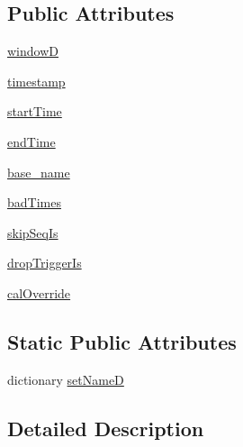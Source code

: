 \subsection*{Public Attributes}
\begin{DoxyCompactItemize}
\item 
\hyperlink{classrepo_1_1programs_1_1pythonpackages_1_1pr_1_1SPDataSet_1_1SPDataSet_a0792732403840d5f03968b1888fa42d6}{window\-D}
\item 
\hyperlink{classrepo_1_1programs_1_1pythonpackages_1_1pr_1_1SPDataSet_1_1SPDataSet_ab6db3c53a18a01fec96f0973c394702a}{timestamp}
\item 
\hyperlink{classrepo_1_1programs_1_1pythonpackages_1_1pr_1_1SPDataSet_1_1SPDataSet_a6e2d1324af2938ac6b23d63d9f8a89c7}{start\-Time}
\item 
\hyperlink{classrepo_1_1programs_1_1pythonpackages_1_1pr_1_1SPDataSet_1_1SPDataSet_ae9f5e533c3e8e9cd46cc8471ef58c2dd}{end\-Time}
\item 
\hyperlink{classrepo_1_1programs_1_1pythonpackages_1_1pr_1_1SPDataSet_1_1SPDataSet_a888b03e4e0141101e71ebd9f46eb494b}{base\-\_\-name}
\item 
\hyperlink{classrepo_1_1programs_1_1pythonpackages_1_1pr_1_1SPDataSet_1_1SPDataSet_aa2465f64a4035369a0d2a5f0b86d39fa}{bad\-Times}
\item 
\hyperlink{classrepo_1_1programs_1_1pythonpackages_1_1pr_1_1SPDataSet_1_1SPDataSet_a8250ad2059e08940bf8cd519c30e7a04}{skip\-Seq\-Is}
\item 
\hyperlink{classrepo_1_1programs_1_1pythonpackages_1_1pr_1_1SPDataSet_1_1SPDataSet_a76a1caf7a18e9170cbce324d1be0b837}{drop\-Trigger\-Is}
\item 
\hyperlink{classrepo_1_1programs_1_1pythonpackages_1_1pr_1_1SPDataSet_1_1SPDataSet_ae16a2ee209ef5a9dbc5d9634b3bc6fef}{cal\-Override}
\end{DoxyCompactItemize}
\subsection*{Static Public Attributes}
\begin{DoxyCompactItemize}
\item 
dictionary \hyperlink{classrepo_1_1programs_1_1pythonpackages_1_1pr_1_1SPDataSet_1_1SPDataSet_a27aa119d0f7a644bb2ca116a89daee82}{set\-Name\-D}
\end{DoxyCompactItemize}


\subsection{Detailed Description}


